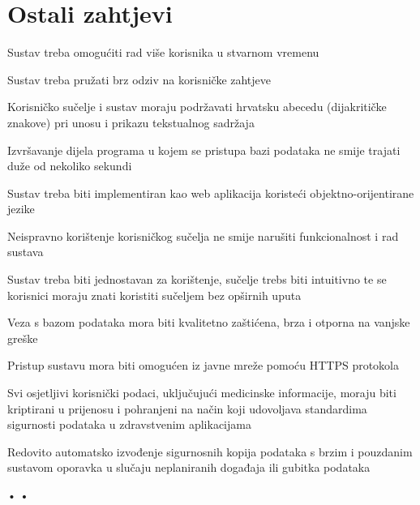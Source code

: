 		\section{Ostali zahtjevi}
			 \begin{packed_item}
				\item Sustav treba omogućiti rad više korisnika u stvarnom vremenu
				\item Sustav treba pružati brz odziv na korisničke zahtjeve
				\item Korisničko sučelje i sustav moraju podržavati hrvatsku abecedu (dijakritičke znakove) pri unosu i prikazu tekstualnog sadržaja
				\item Izvršavanje dijela programa u kojem se pristupa bazi podataka ne smije trajati duže od nekoliko sekundi
				\item Sustav treba biti implementiran kao web aplikacija koristeći objektno-orijentirane jezike
				\item Neispravno korištenje korisničkog sučelja ne smije narušiti funkcionalnost i rad sustava
				\item Sustav treba biti jednostavan za korištenje, sučelje trebs biti intuitivno te se korisnici moraju znati koristiti sučeljem bez opširnih uputa
				\item Veza s bazom podataka mora biti kvalitetno zaštićena, brza i otporna na vanjske greške
				\item Pristup sustavu mora biti omogućen iz javne mreže pomoću HTTPS protokola
				\item Svi osjetljivi korisnički podaci, uključujući medicinske informacije, moraju biti kriptirani u 
				prijenosu i pohranjeni na način koji udovoljava standardima sigurnosti podataka u zdravstvenim aplikacijama
				\item Redovito automatsko izvođenje sigurnosnih kopija podataka s brzim i pouzdanim sustavom oporavka u slučaju neplaniranih događaja ili gubitka podataka
			 \end{packed_item}
			 


• 
• 
			 
			 
	